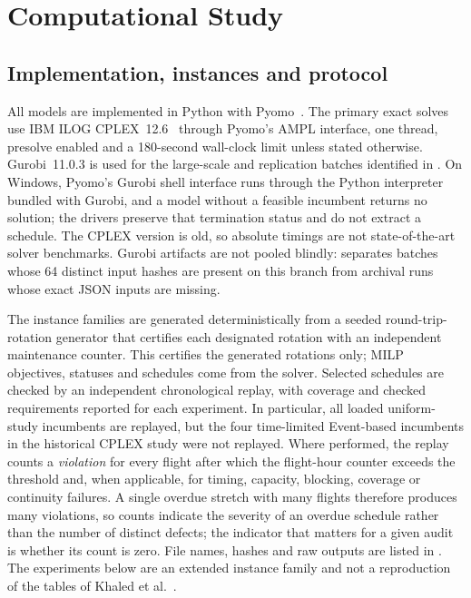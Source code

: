 \section{Computational Study}
\label{sec:computational}

\subsection{Implementation, instances and protocol}
\label{subsec:setup}

All models are implemented in Python with Pyomo~\citep{pyomo2023}. The
primary exact solves use IBM ILOG CPLEX~12.6~\citep{cplex2023} through Pyomo's
AMPL interface, one thread, presolve enabled and a 180-second wall-clock limit
unless stated otherwise. Gurobi~11.0.3 \citep{gurobi2024} is used for the
large-scale and replication batches identified in
. On Windows, Pyomo's Gurobi shell
interface runs through the Python interpreter bundled with Gurobi, and a model
without a feasible incumbent returns no solution; the drivers preserve that
termination status and do not extract a schedule. The CPLEX version is old, so
absolute timings are not state-of-the-art solver benchmarks. Gurobi artifacts
are not pooled blindly:  separates batches
whose 64 distinct input hashes are present on this branch from archival runs
whose exact JSON inputs are missing.

The instance families are generated deterministically from a seeded
round-trip-rotation generator that certifies each designated rotation with an
independent maintenance counter. This certifies the generated rotations only;
MILP objectives, statuses and schedules come from the solver. Selected
schedules are checked by an independent chronological replay, with coverage
and checked requirements reported for each experiment. In particular, all
loaded uniform-study incumbents are replayed, but the four time-limited
Event-based incumbents in the historical CPLEX study were not replayed.
Where performed, the replay counts a \emph{violation} for every flight after
which the flight-hour counter exceeds the threshold and, when applicable, for
timing, capacity, blocking, coverage or continuity failures. A single overdue
stretch with many flights therefore produces many violations, so counts indicate
the severity of an overdue schedule rather than the number of distinct defects;
the indicator that matters for a given audit is whether its count is zero.
File names, hashes and raw outputs
are listed in . The experiments below are an extended
instance family and not a reproduction of the tables of Khaled et
al.~\citep{khaled2018compact}.

